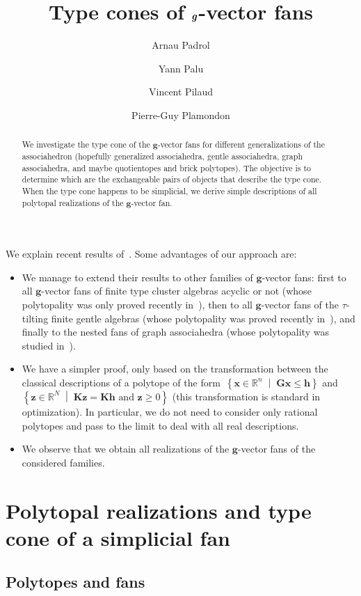 \documentclass{amsart}
\title{Type cones of $\b{g}$-vector fans}
\author{Arnau Padrol}
\author{Yann Palu}
\author{Vincent Pilaud}
\author{Pierre-Guy Plamondon}
\theoremstyle{definition}
\newcommand{\R}{\mathbb{R}} %
\renewcommand{\b}[1]{{\boldsymbol{#1}}} %
\newcommand{\set}[2]{\left\{ #1 \;\middle|\; #2 \right\}} %
\begin{document}
\begin{abstract}
We investigate the type cone of the $\b{g}$-vector fans for different generalizations of the associahedron (hopefully generalized associahedra, gentle associahedra, graph associahedra, and maybe quotientopes and brick polytopes).
The objective is to determine which are the exchangeable pairs of objects that describe the type cone.
When the type cone happens to be simplicial, we derive simple descriptions of all polytopal realizations of the $\b{g}$-vector fan.
\end{abstract}

\maketitle

We explain recent results of~\cite{BazierMatteDouvilleMousavandThomasYildirim}. Some advantages of our approach are:
\begin{itemize}
\item We manage to extend their results to other families of $\b{g}$-vector fans: first to all $\b{g}$-vector fans of finite type cluster algebras acyclic or not (whose polytopality was only proved recently in~\cite{HohlwegPilaudStella}), then to all $\b{g}$-vector fans of the $\tau$-tilting finite gentle algebras (whose polytopality was proved recently in~\cite{PaluPilaudPlamondon-nonkissing}), and finally to the nested fans of graph associahedra (whose polytopality was studied in~\cite{CarrDevadoss, Devadoss, Postnikov, FeichtnerSturmfels, Zelevinsky}).
\item We have a simpler proof, only based on the transformation between the classical descriptions of a polytope of the form~$\set{\b{x} \in \R^n}{\b{G}\b{x} \le \b{h}}$ and~$\set{\b{z} \in \R^N}{\b{K}\b{z} = \b{K}\b{h} \text{ and } \b{z} \ge 0}$ (this transformation is standard in optimization). In particular, we do not need to consider only rational polytopes and pass to the limit to deal with all real descriptions.
\item We observe that we obtain all realizations of the $\b{g}$-vector fans of the considered families.
\end{itemize}


\section{Polytopal realizations and type cone of a simplicial fan}

\subsection{Polytopes and fans}
\end{document}
